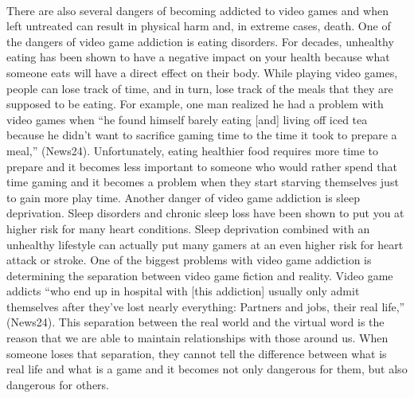\documentclass[a4paper,man,natbib]{apa6}
\begin{document}
\paragraph{}
There are also several dangers of becoming addicted to video games and when left untreated can result in physical harm and, in extreme cases, death. One of the dangers of video game addiction is eating disorders. For decades, unhealthy eating has been shown to have a negative impact on your health because what someone eats will have a direct effect on their body. While playing video games, people can lose track of time, and in turn, lose track of the meals that they are supposed to be eating. For example, one man realized he had a problem with video games when “he found himself barely eating [and] living off iced tea because he didn't want to sacrifice gaming time to the time it took to prepare a meal,” (News24). Unfortunately, eating healthier food requires more time to prepare and it becomes less important to someone who would rather spend that time gaming and it becomes a problem when they start starving themselves just to gain more play time. Another danger of video game addiction is sleep deprivation. Sleep disorders and chronic sleep loss have been shown to put you at higher risk for many heart conditions. Sleep deprivation combined with an unhealthy lifestyle can actually put many gamers at an even higher risk for heart attack or stroke. One of the biggest problems with video game addiction is determining the separation between video game fiction and reality. Video game addicts “who end up in hospital with [this addiction] usually only admit themselves after they've lost nearly everything: Partners and jobs, their real life,” (News24). This separation between the real world and the virtual word is the reason that we are able to maintain relationships with those around us. When someone loses that separation, they cannot tell the difference between what is real life and what is a game and it becomes not only dangerous for them, but also dangerous for others.
\end{document}
